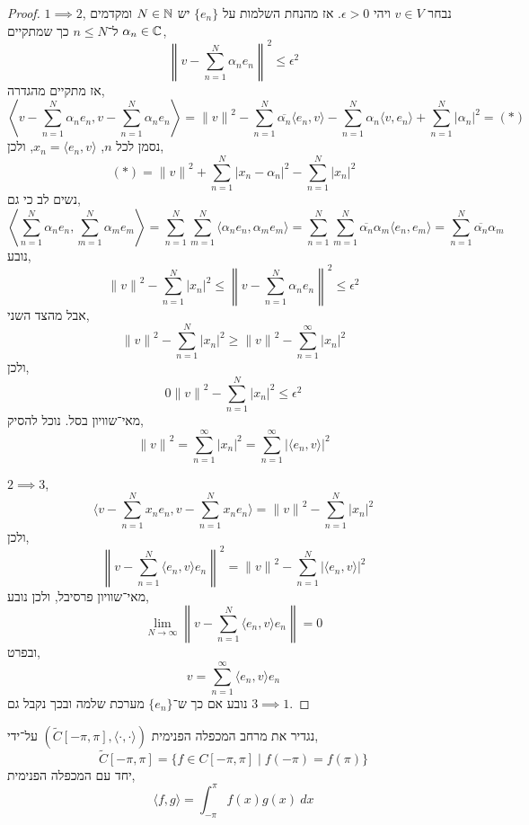 \begin{proof}
	$1 \implies 2$,
	נבחר $v \in V$ ויהי $\epsilon > 0$.
	אז מהנחת השלמות על $\{ e_n \}$ יש $N \in \mathbb{N}$ ומקדמים $\alpha_n \in \mathbb{C}$ ל־$n \le N$ כך שמתקיים,
	\[
		{\left\lVert v - \sum_{n = 1}^N \alpha_n e_n \right\rVert}^2
		\le \epsilon^2
	\]
	אז מתקיים מהגדרה,
	\[
		\left\langle v - \sum_{n = 1}^N \alpha_n e_n, v - \sum_{n = 1}^N \alpha_n e_n \right\rangle	
		= {\lVert v \rVert}^2 - \sum_{n = 1}^N \overline{\alpha_n} \langle e_n, v \rangle - \sum_{n = 1}^N \alpha_n \langle v, e_n \rangle + \sum_{n = 1}^N {| \alpha_n |}^2
		= (*)
	\]
	נסמן לכל $n$, $x_n = \langle e_n, v \rangle$, ולכן,
	\[
		(*)
		= {\lVert v \rVert}^2 + \sum_{n = 1}^N {| x_n - \alpha_n |}^2 - \sum_{n = 1}^N {| x_n |}^2
	\]
	נשים לב כי גם,
	\[
		\left\langle \sum_{n = 1}^N \alpha_n e_n, \sum_{m = 1}^N \alpha_m e_m \right\rangle
		= \sum_{n = 1}^N \sum_{m = 1}^N \langle \alpha_n e_n, \alpha_m e_m \rangle
		= \sum_{n = 1}^N \sum_{m = 1}^N \overline{\alpha_n} \alpha_m \langle e_n, e_m \rangle
		= \sum_{n = 1}^N \overline{\alpha_n} \alpha_m
	\]
	נובע,
	\[
		{\lVert v \rVert}^2 - \sum_{n = 1}^N {| x_n |}^2
		\le {\left\lVert v - \sum_{n = 1}^N \alpha_n e_n \right\rVert}^2
		\le \epsilon^2
	\]
	אבל מהצד השני,
	\[
		{\lVert v \rVert}^2 - \sum_{n = 1}^N {| x_n |}^2
		\ge {\lVert v \rVert}^2 - \sum_{n = 1}^\infty {| x_n |}^2
	\]
	ולכן,
	\[
		0
		{\lVert v \rVert}^2 - \sum_{n = 1}^N {| x_n |}^2
		\le \epsilon^2
	\]
	מאי־שוויון בסל.
	נוכל להסיק,
	\[
		{\lVert v \rVert}^2 = \sum_{n = 1}^\infty {| x_n |}^2
		= \sum_{n = 1}^\infty {|\langle e_n, v \rangle|}^2
	\]

	$2 \implies 3$,
	\[
		\langle v - \sum_{n = 1}^N x_n e_n, v - \sum_{n = 1}^N x_n e_n \rangle
		= {\lVert v \rVert}^2 - \sum_{n = 1}^N {| x_n |}^2
	\]
	ולכן,
	\[
		{\left\lVert v - \sum_{n = 1}^N \langle e_n, v \rangle e_n \right\rVert}^2
		= {\lVert v \rVert}^2 - \sum_{n = 1}^N {| \langle e_n, v \rangle |}^2
	\]
	מאי־שוויון פרסיבל, ולכן נובע,
	\[
		\lim_{N \to \infty} \left\lVert v - \sum_{n = 1}^N \langle e_n, v \rangle e_n \right\rVert
		= 0
	\]
	ובפרט,
	\[
		v = \sum_{n = 1}^\infty \langle e_n, v \rangle e_n
	\]
	נובע אם כך ש־$\{ e_n \}$ מערכת שלמה ובכך נקבל גם $3 \implies 1$.
\end{proof}
\begin{definition}
	נגדיר את מרחב המכפלה הפנימית $(\tilde{C}[-\pi, \pi], \langle \cdot, \cdot \rangle)$ על־ידי,
	\[
		\tilde{C}[-\pi, \pi]
		= \{ f \in C[-\pi, \pi] \mid f(-\pi) = f(\pi) \}
	\]
	יחד עם המכפלה הפנימית,
	\[
		\langle f, g \rangle
		= \int_{-\pi}^{\pi} f(x) g(x)\ dx
	\]
\end{definition}
